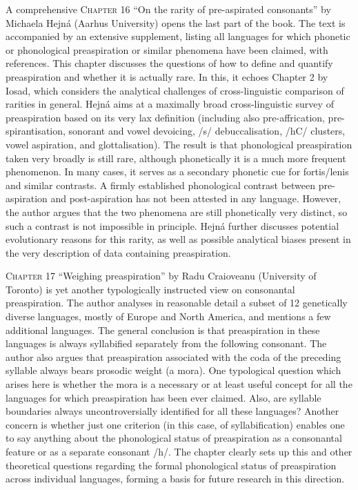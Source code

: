 \documentclass[output=paper]{langscibook}
\begin{document}
A comprehensive \textsc{Chapter 16} “On the rarity of pre-aspirated consonants” by Michaela Hejná (Aarhus University) opens the last part of the book. The text is accompanied by an extensive supplement, listing all languages for which phonetic or phonological preaspiration or similar phenomena have been claimed, with references. This chapter discusses the questions of how to define and quantify preaspiration and whether it is actually rare. In this, it echoes Chapter 2 by Iosad, which considers the analytical challenges of cross-linguistic comparison of rarities in general. Hejná aims at a maximally broad cross-linguistic survey of preaspiration based on its very lax definition (including also pre-affrication, pre-spirantisation, sonorant and vowel devoicing, /s/ debuccalisation, /hC/ clusters, vowel aspiration, and glottalisation). The result is that phonological preaspiration taken very broadly is still rare, although phonetically it is a much more frequent phenomenon. In many cases, it serves as a secondary phonetic cue for fortis/lenis and similar contrasts. A firmly established phonological contrast between pre-aspiration and post-aspiration has not been attested in any language. However, the author argues that the two phenomena are still phonetically very distinct, so such a contrast is not impossible in principle. Hejná further discusses potential evolutionary reasons for this rarity, as well as possible analytical biases present in the very description of data containing preaspiration.

\textsc{Chapter 17} “Weighing preaspiration” by Radu Craioveanu (University of To\-ron\-to) is yet another typologically instructed view on consonantal preaspiration. The author analyses in reasonable detail a subset of 12 genetically diverse languages, mostly of Europe and North America, and mentions a few additional languages. The general conclusion is that preaspiration in these languages is always syllabified separately from the following consonant. The author also argues that preaspiration associated with the coda of the preceding syllable always bears prosodic weight (a mora). One typological question which arises here is whether the mora is a necessary or at least useful concept for all the languages for which preaspiration has been ever claimed. Also, are syllable boundaries always uncontroversially identified for all these languages? Another concern is whether just one criterion (in this case, of syllabification) enables one to say anything about the phonological status of preaspiration as a consonantal feature or as a separate consonant /h/. The chapter clearly sets up this and other theoretical questions regarding the formal phonological status of preaspiration across individual languages, forming a basis for future research in this direction.
\end{document}
